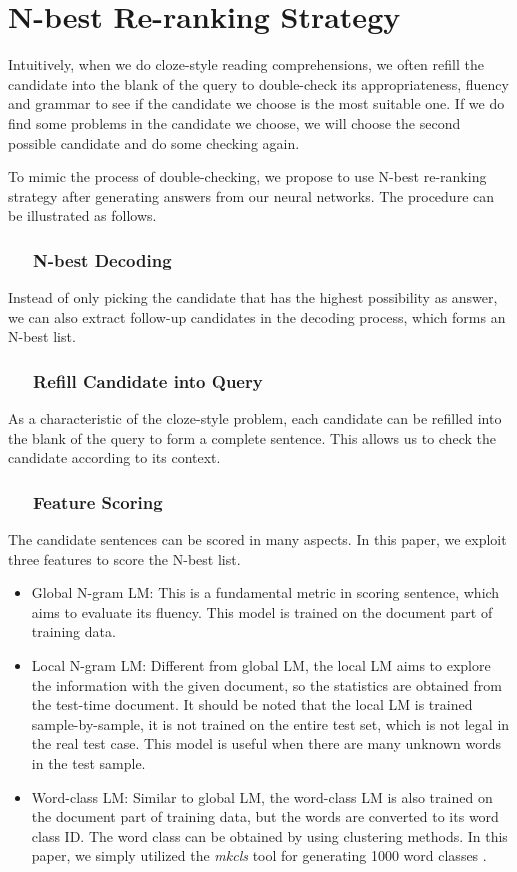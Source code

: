\documentclass[11pt,a4paper]{article}
\begin{document}
        
\section{N-best Re-ranking Strategy}\label{reranking}

Intuitively, when we do cloze-style reading comprehensions, we often refill the candidate into the blank of the query to double-check its appropriateness, fluency and grammar to see if the candidate we choose is the most suitable one. If we do find some problems in the candidate we choose, we will choose the second possible candidate and do some checking again.

To mimic the process of double-checking, we propose to use N-best re-ranking strategy after generating answers from our neural networks. 
The procedure can be illustrated as follows.

\subsubsection*{~~ N-best Decoding}
Instead of only picking the candidate that has the highest possibility as answer, we can also extract follow-up candidates in the decoding process, which forms an N-best list.

\subsubsection*{~~ Refill Candidate into Query}
As a characteristic of the cloze-style problem, each candidate can be refilled into the blank of the query to form a complete sentence.
This allows us to check the candidate according to its context.

\subsubsection*{~~ Feature Scoring}
The candidate sentences can be scored in many aspects.
In this paper, we exploit three features to score the N-best list.

\begin{itemize}
  \item Global N-gram LM: This is a fundamental metric in scoring sentence, which aims to evaluate its fluency. This model is trained on the document part of training data.
  \item Local N-gram LM: Different from global LM, the local LM aims to explore the information with the given document, so the statistics are obtained from the test-time document. It should be noted that the local LM is trained sample-by-sample, it is not trained on the entire test set, which is not legal in the real test case. This model is useful when there are many unknown words in the test sample.
  \item Word-class  LM: Similar to global LM, the word-class LM is also trained on the document part of training data, but the words are converted to its word class ID. The word class can be obtained by using clustering methods. In this paper, we simply utilized the {\em mkcls} tool for generating 1000 word classes \cite{och-1999}.
\end{itemize}
\end{document}
